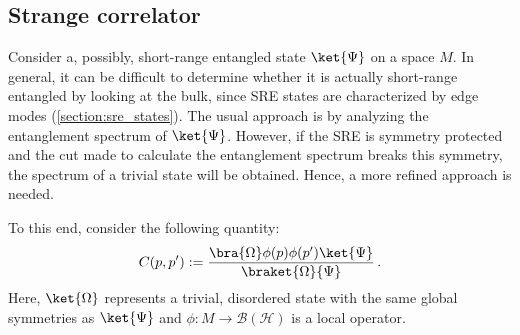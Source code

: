 
\subsection{Strange correlator}

    Consider a, possibly, short-range entangled state $\ket{\Psi}$ on a space $M$. In general, it can be difficult to determine whether it is actually short-range entangled by looking at the bulk, since SRE states are characterized by edge modes (\cref{section:sre_states}). The usual approach is by analyzing the entanglement spectrum of $\ket{\Psi}$. However, if the SRE is symmetry protected and the cut made to calculate the entanglement spectrum breaks this symmetry, the spectrum of a trivial state will be obtained. Hence, a more refined approach is needed.

    To this end, consider the following quantity:
    \begin{gather}
        C(p,p') := \frac{\bra{\Omega}\phi(p)\phi(p')\ket{\Psi}}{\braket{\Omega}{\Psi}}\,.
    \end{gather}
    Here, $\ket{\Omega}$ represents a trivial, disordered state with the same global symmetries as $\ket{\Psi}$ and $\phi:M\rightarrow\mathcal{B}(\mathcal{H})$ is a local operator.

    

